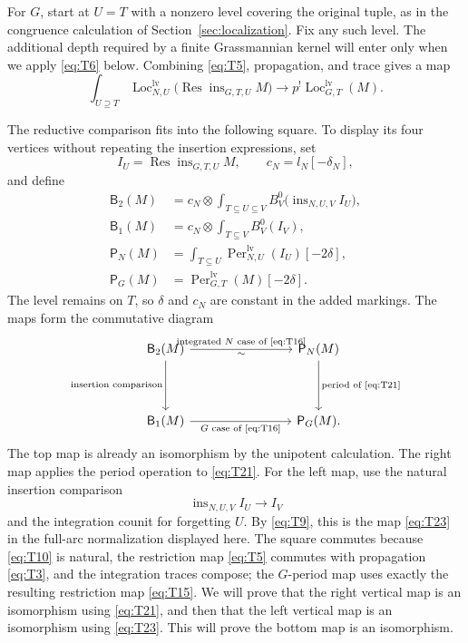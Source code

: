 \documentclass[11pt]{article}
\numberwithin{equation}{section}
\theoremstyle{definition}
\theoremstyle{remark}
\begin{document}
For $G$, start at $U=T$ with a nonzero level covering the original tuple,
as in the congruence calculation of Section~\ref{sec:localization}.
Fix any such level.  The additional depth required by a finite
Grassmannian kernel will enter only when we apply \eqref{eq:T6} below.
Combining \eqref{eq:T5}, propagation, and trace gives a map
\begin{equation}\label{eq:T21}
 \int_{U\supseteq T}
  \operatorname{Loc}_{N,U}^{\mathrm{lv}}
       \bigl(\operatorname{Res}\operatorname{ins}_{G,T,U}M\bigr)
 \longrightarrow p^!\operatorname{Loc}_{G,T}^{\mathrm{lv}}(M).
\end{equation}

The reductive comparison fits into the following square.  To display its
four vertices without repeating the insertion expressions, set
\[
 I_U=\operatorname{Res}\operatorname{ins}_{G,T,U}M,
 \qquad c_N=l_N[-\delta_N],
\]
and define
\[
\begin{aligned}
 \mathsf B_2(M)
   &=c_N\otimes\int_{T\subseteq U\subseteq V}
       B_V^0\bigl(\operatorname{ins}_{N,U,V}I_U\bigr),\\
 \mathsf B_1(M)
   &=c_N\otimes\int_{T\subseteq V}B_V^0(I_V),\\
 \mathsf P_N(M)
   &=\int_{T\subseteq U}\operatorname{Per}_{N,U}^{\mathrm{lv}}(I_U)
                                            [-2\delta],\\
 \mathsf P_G(M)
   &=\operatorname{Per}_{G,T}^{\mathrm{lv}}(M)[-2\delta].
\end{aligned}
\]
The level remains on $T$, so $\delta$ and $c_N$ are constant in the added
markings.  The maps form the commutative diagram
\begin{equation}\label{eq:ran-reductive-square}
\begin{tikzcd}[column sep=8em,row sep=4em]
 \mathsf B_2(M)
   \arrow[r,"\text{integrated $N$ case of \eqref{eq:T16}}","\sim"']
   \arrow[d,"\text{insertion comparison}"']
 &\mathsf P_N(M)
   \arrow[d,"\text{period of \eqref{eq:T21}}"]\\
 \mathsf B_1(M)
   \arrow[r,"\text{$G$ case of \eqref{eq:T16}}"']
 &\mathsf P_G(M).
\end{tikzcd}
\end{equation}
The top map is already an isomorphism by the unipotent calculation.  The
right map applies the period operation to \eqref{eq:T21}.  For the left
map, use the natural insertion comparison
\[
 \operatorname{ins}_{N,U,V}I_U\longrightarrow I_V
\]
and the integration counit for forgetting $U$.  By \eqref{eq:T9}, this is
the map \eqref{eq:T23} in the full-arc normalization displayed here.
The square commutes because \eqref{eq:T10} is natural, the restriction
map \eqref{eq:T5} commutes with propagation \eqref{eq:T3}, and the
integration traces compose; the $G$-period map uses exactly the resulting
restriction map \eqref{eq:T15}.  We will prove that the right vertical
map is an isomorphism using \eqref{eq:T21}, and then that the left
vertical map is an isomorphism using \eqref{eq:T23}.  This will prove the
bottom map is an isomorphism.
\end{document}
